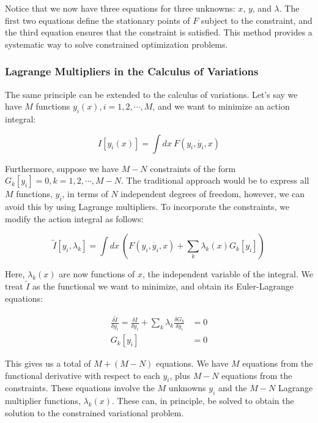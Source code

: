 Notice that we now have three equations for three unknowns: $x$, $y$, and $\lambda$. The 
first two equations define the stationary points of $F$ subject to the constraint, and 
the third equation ensures that the constraint is satisfied. This method provides a 
systematic way to solve constrained optimization problems.

\subsubsection{Lagrange Multipliers in the Calculus of Variations}

The same principle can be extended to the calculus of variations. Let's say we have $M$ 
functions $y_i\left(x\right), i = 1, 2, \cdots, M$, and we want to minimize an action 
integral:

\begin{equation}
    I[y_i\left(x\right)] = \int dx \ F\left(y_i, \dot{y_i}, x\right)
\end{equation}

Furthermore, suppose we have $M-N$ constraints of the form $G_k[y_i] = 0, k = 1, 2, \cdots, M - N$. 
The traditional approach would be to express all $M$ functions, $y_i$, in terms of $N$ 
independent degrees of freedom, however, we can avoid this by using Lagrange multipliers. 
To incorporate the constraints, we modify the action integral as follows:

\begin{equation}
    \tilde{I}[y_i, \lambda_k] = \int dx \ \left(F\left(y_i, \dot{y_i}, x\right) + \sum_k \lambda_k \left(x\right) G_k[y_i]\right)
\end{equation}

Here, $\lambda_k(x)$ are now functions of $x$, the independent variable of the integral. 
We treat $\tilde{I}$ as the functional we want to minimize, and obtain its Euler-Lagrange 
equations:

\begin{align}
    \frac{\delta \tilde{I}}{\delta y_i}  = \frac{\delta I}{\delta y_i} + \sum_k \lambda_k \frac{\delta G_k}{\delta y_i} &= 0 \\
    G_k[y_i] &= 0
\end{align}

This gives us a total of $M + (M - N)$ equations. We have $M$ equations from the 
functional derivative with respect to each $y_i$, plus $M-N$ equations from the 
constraints. These equations involve the $M$ unknowns  $y_i$ and the $M-N$ Lagrange 
multiplier functions, $\lambda_k(x)$. These can, in principle, be solved to obtain the 
solution to the constrained variational problem.

